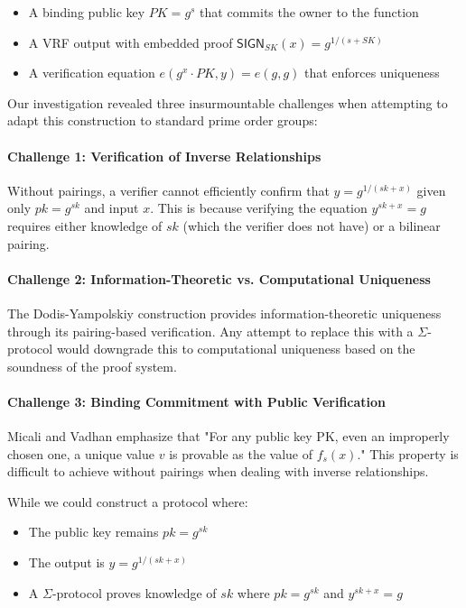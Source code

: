\begin{itemize}
    \item A binding public key $PK = g^s$ that commits the owner to the function
    \item A VRF output with embedded proof $\textsf{SIGN}_{SK}(x) = g^{1/(s+SK)}$
    \item A verification equation $e(g^x \cdot PK, y) = e(g, g)$ that enforces uniqueness
\end{itemize}

Our investigation revealed three insurmountable challenges when attempting to adapt this construction to standard prime order groups:

\paragraph{Challenge 1: Verification of Inverse Relationships} Without pairings, a verifier cannot efficiently confirm that $y = g^{1/(sk+x)}$ given only $pk = g^{sk}$ and input $x$. This is because verifying the equation $y^{sk+x} = g$ requires either knowledge of $sk$ (which the verifier does not have) or a bilinear pairing.

\paragraph{Challenge 2: Information-Theoretic vs. Computational Uniqueness} The Dodis-Yampolskiy construction provides information-theoretic uniqueness through its pairing-based verification. Any attempt to replace this with a $\Sigma$-protocol would downgrade this to computational uniqueness based on the soundness of the proof system.

\paragraph{Challenge 3: Binding Commitment with Public Verification} Micali and Vadhan emphasize that "For any public key PK, even an improperly chosen one, a unique value $v$ is provable as the value of $f_s(x)$." This property is difficult to achieve without pairings when dealing with inverse relationships.

While we could construct a protocol where:
\begin{itemize}
    \item The public key remains $pk = g^{sk}$
    \item The output is $y = g^{1/(sk+x)}$
    \item A $\Sigma$-protocol proves knowledge of $sk$ where $pk = g^{sk}$ and $y^{sk+x} = g$
\end{itemize}

